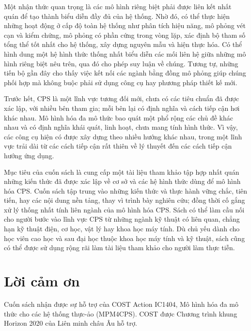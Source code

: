 Một nhận thức quan trọng là các mô hình riêng biệt phải được liên kết nhất quán để tạo thành biểu diễn đầy đủ của hệ thống. Nhờ đó, có thể thực hiện những hoạt động ở cấp độ toàn hệ thống như phân tích hiệu năng, mô phỏng vét cạn và kiểm chứng, mô phỏng có phần cứng trong vòng lặp, xác định bộ tham số tổng thể tốt nhất cho hệ thống, xây dựng nguyên mẫu và hiện thực hóa. Có thể hình dung một hệ hình thức thống nhất biểu diễn các mối liên hệ giữa những mô hình riêng biệt nêu trên, qua đó cho phép suy luận về chúng. Tương tự, những tiến bộ gần đây cho thấy việc kết nối các ngành bằng đồng mô phỏng giúp chúng phối hợp mà không buộc phải sử dụng công cụ hay phương pháp thiết kế mới.

Trước hết, CPS là một lĩnh vực tương đối mới, chưa có các tiêu chuẩn đã được xác lập, với nhiều bên tham gia; mỗi bên lại có định nghĩa và cách tiếp cận hơi khác nhau. Mô hình hóa đa mô thức bao quát một phổ rộng các chủ đề khác nhau và có định nghĩa khái quát, linh hoạt, chưa mang tính hình thức. Vì vậy, các công cụ hiện có được xây dựng theo nhiều hướng khác nhau, trong một lĩnh vực trải dài từ các cách tiếp cận rất thiên về lý thuyết đến các cách tiếp cận hướng ứng dụng.

Mục tiêu của cuốn sách là cung cấp một tài liệu tham khảo tập hợp nhất quán những kiến thức đã được xác lập về cơ sở và các hệ hình thức dùng để mô hình hóa CPS. Cuốn sách tập trung vào những kiến thức và thực hành vững chắc, tiên tiến, hay các nội dung nền tảng, thay vì trình bày nghiên cứu; đồng thời cố gắng xử lý thống nhất tính liên ngành của mô hình hóa CPS. Sách có thể làm cầu nối cho người bước vào lĩnh vực CPS từ những ngành kỹ thuật có liên quan, chẳng hạn kỹ thuật điện, cơ học, vật lý hay khoa học máy tính. Dù chủ yếu dành cho học viên cao học và sau đại học thuộc khoa học máy tính và kỹ thuật, sách cũng có thể được sử dụng rộng rãi làm tài liệu tham khảo cho người làm thực tiễn.

\chapter*{Lời cảm ơn}
Cuốn sách nhận được sự hỗ trợ của COST Action IC1404, Mô hình hóa đa mô thức cho các hệ thống thực-ảo (MPM4CPS). COST được Chương trình khung Horizon 2020 của Liên minh châu Âu hỗ trợ.
